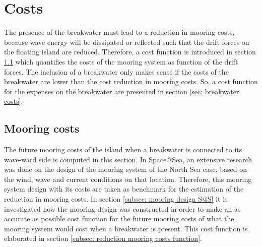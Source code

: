 \section{Costs}

The presence of the breakwater must lead to a reduction in mooring costs, because wave energy will be dissipated or reflected such that the drift forces on the floating island are reduced. Therefore, a cost function is introduced in section \ref{sec: mooring costs} which quantifies the costs of the mooring system as function of the drift forces.  The inclusion of a breakwater only makes sense if the costs of the breakwater are lower than the cost reduction in mooring costs. So, a cost function for the expenses on the breakwater are presented in section \ref{sec: breakwater costs}.




\subsection{Mooring costs}
\label{sec: mooring costs}



The future mooring costs of the island when a breakwater is connected to its wave-ward side is computed in this section. In Space@Sea, an extensive research was done on the design of the mooring system of the North Sea case, based on the wind, wave and current conditions on that location. Therefore, this mooring system design with its costs are taken as benchmark for the estimation of the reduction in mooring costs. In section \ref{subsec: mooring design S@S} it is investigated how the mooring design was constructed in order to make an as accurate as possible cost function for the future mooring costs of what the mooring system would cost when a breakwater is present. This cost function is elaborated in section \ref{subsec: reduction mooring costs function}.


